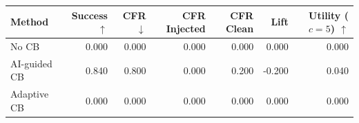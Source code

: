 \begin{tabular}{lrrrrrr}
\toprule
Method & Success $\uparrow$ & CFR $\downarrow$ & CFR Injected & CFR Clean & Lift & Utility ($c=5$) $\uparrow$ \\
\midrule
No CB & 0.000 & 0.000 & 0.000 & 0.000 & 0.000 & 0.000 \\
AI-guided CB & 0.840 & 0.800 & 0.000 & 0.200 & -0.200 & 0.040 \\
Adaptive CB & 0.000 & 0.000 & 0.000 & 0.000 & 0.000 & 0.000 \\
\bottomrule
\end{tabular}

